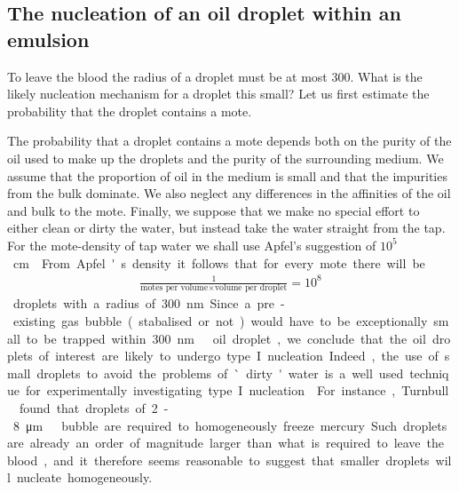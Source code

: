 \subsection{The nucleation of an oil droplet within an emulsion}


To leave the blood the radius of a droplet must be at  most  \unit{300}\nano\metre.
What is the likely nucleation mechanism for a droplet this small?
Let us first estimate the probability that the droplet contains a mote.

The probability that a droplet contains a mote depends both on the purity of the oil used to make up the droplets
and the purity of the surrounding medium.
We assume that the proportion of oil in the medium is small and that the impurities from the bulk dominate.
We also neglect any differences in the affinities of the oil and bulk to the mote.
Finally, we suppose that we make no special effort to either clean or dirty the water,
but instead take the water straight from the tap.
For the mote-density of tap water we shall use Apfel's\cite{Apfel1984} suggestion  of \unit{$10^5$}\centi\metre\rpcubed.

From Apfel's density it follows that for every mote there will be
\begin{align}
\frac{1}{\text{motes per volume}\times\text{volume per droplet}} = 10^8
\end{align} 
droplets with a radius of \unit{300}\nano\metre.
Since a pre-existing gas bubble (stabalised or not) would have to be exceptionally small to be trapped within \unit{300}\nano\metre\ oil droplet,
we conclude that  the oil droplets of interest are  likely to undergo type I nucleation.
Indeed, the use of small droplets to avoid the problems of `dirty' water is  a well used technique for experimentally investigating type I nucleation\cite{Turnbull1952, HongChul2005,Apfel1984}.
For instance, Turnbull\cite{1952} found that droplets of 2-\unit{8}\micro\metre\ bubble are required to homogeneously freeze mercury.  
Such droplets are already an order of magnitude larger than what is required to leave the blood,
and it therefore seems reasonable to suggest that smaller droplets will nucleate homogeneously.




